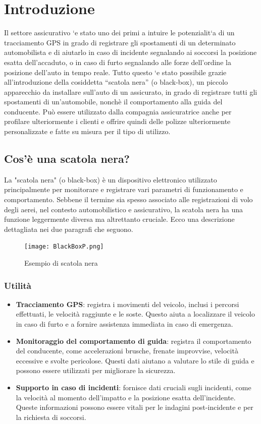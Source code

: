 \documentclass[12pt, a4paper, italian]{report}
\numberwithin{figure}{chapter}
\numberwithin{table}{chapter}
\begin{document}
\chapter{Introduzione}
Il settore assicurativo `e stato uno dei primi a intuire le potenzialit`a di un tracciamento GPS in grado di registrare gli spostamenti di un determinato automobilista
e di aiutarlo in caso di incidente segnalando ai soccorsi la posizione esatta dell’accaduto, o in caso di furto segnalando alle forze dell’ordine la posizione dell’auto in
tempo reale. Tutto questo `e stato possibile grazie all’introduzione della cosiddetta
“scatola nera” (o black-box), un piccolo apparecchio da installare sull’auto di un
assicurato, in grado di registrare tutti gli spostamenti di un’automobile, nonchè il
comportamento alla guida del conducente. Può essere utilizzato dalla compagnia
assicuratrice anche per profilare ulteriormente i clienti e offrire quindi delle polizze
ulteriormente personalizzate e fatte su misura per il tipo di utilizzo.
\section{Cos'è una scatola nera?}
La "scatola nera" (o black-box) è un dispositivo elettronico utilizzato principalmente per monitorare e registrare vari parametri di funzionamento e comportamento. Sebbene il termine sia spesso associato alle registrazioni di volo degli aerei, nel contesto automobilistico e assicurativo, la scatola nera ha una funzione leggermente diversa ma altrettanto cruciale. Ecco una descrizione dettagliata nei due paragrafi che seguono.

\begin{figure}[h] \centering
\texttt{[image: BlackBoxP.png]}
\caption{Esempio di scatola nera\protect\footnotemark}
\label{fig:scatolaNera}
\end{figure}

\subsection{Utilità}
\begin{itemize}
    \item \textbf{Tracciamento GPS}: registra i movimenti del veicolo, inclusi i percorsi effettuati, le velocità raggiunte e le soste. Questo aiuta a localizzare il veicolo in caso di furto e a fornire assistenza immediata in caso di emergenza.
    \item \textbf{Monitoraggio del comportamento di guida}: registra il comportamento del conducente, come accelerazioni brusche, frenate improvvise, velocità eccessive e svolte pericolose. Questi dati aiutano a valutare lo stile di guida e possono essere utilizzati per migliorare la sicurezza.
    \item \textbf{Supporto in caso di incidenti}: fornisce dati cruciali sugli incidenti, come la velocità al momento dell'impatto e la posizione esatta dell'incidente. Queste informazioni possono essere vitali per le indagini post-incidente e per la richiesta di soccorsi.
\end{itemize}
\end{document}
